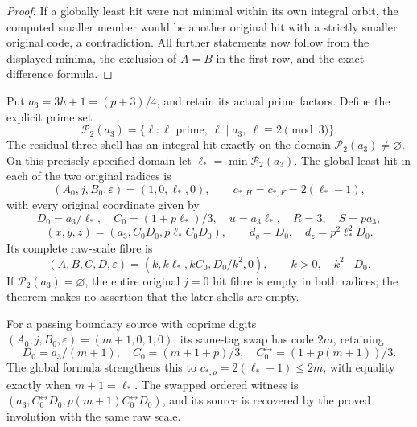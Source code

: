\begin{proof}
If a globally least hit were not minimal within its own integral
orbit, the computed smaller member would be another original hit
with a strictly smaller original code, a contradiction. All further
statements now follow from the displayed minima, the exclusion of
\(A=B\) in the first row, and the exact difference formula.
\end{proof}

\begin{theorem}
\label{thm:boundary-r3-global-minimum}
Put \(a_3=3h+1=(p+3)/4\), and retain its actual prime factors.
Define the explicit prime set
\[
 \mathcal P_2(a_3)=\{\ell:\ell\text{ prime},\ \ell\mid a_3,
                                  \ \ell\equiv2\pmod3\}.
\]
The residual-three shell has an integral hit exactly on the domain
\(\mathcal P_2(a_3)\ne\varnothing\). On this precisely
specified domain let \(\ell_*=\min\mathcal P_2(a_3)\).
The global least hit in each of the two original radices is
\[
 (A_0,j,B_0,\varepsilon)=(1,0,\ell_*,0),\qquad
 c_{*,H}=c_{*,F}=2(\ell_*-1),
\]
with every original coordinate given by
\[
 D_0=a_3/\ell_*,\quad C_0=(1+p\ell_*)/3,\quad
 u=a_3\ell_*,\quad R=3,\quad S=pa_3,
\]
\[
 (x,y,z)=(a_3,C_0D_0,p\ell_*C_0D_0),\qquad
 d_y=D_0,\quad d_z=p^2\ell_*^2D_0.
\]
Its complete raw-scale fibre is
\[
 (A,B,C,D,\varepsilon)
    =(k,k\ell_*,kC_0,D_0/k^2,0),\qquad k>0,\quad k^2\mid D_0.
\]
If \(\mathcal P_2(a_3)=\varnothing\), the entire original
\(j=0\) hit fibre is empty in both radices; the theorem makes
no assertion that the later shells are empty.

For a passing boundary source with coprime digits
\((A_0,j,B_0,\varepsilon)=(m+1,0,1,0)\), its same-tag
swap has code \(2m\), retaining
\[
 D_0=a_3/(m+1),\quad
 C_0=(m+1+p)/3,\quad C_0^{\leftrightarrow}=(1+p(m+1))/3.
\]
The global formula strengthens this to
\(c_{*,\rho}=2(\ell_*-1)\le2m\), with equality exactly
when \(m+1=\ell_*\). The swapped ordered witness is
\((a_3,C_0^{\leftrightarrow}D_0,
 p(m+1)C_0^{\leftrightarrow}D_0)\), and its source is
recovered by the proved involution with the same raw scale.
\end{theorem}
